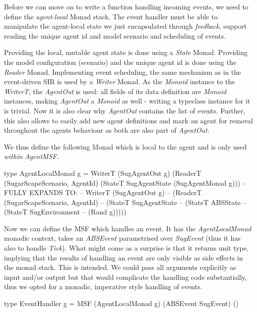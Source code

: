 Before we can move on to write a function handling incoming events, we need to define the \textit{agent-local} Monad stack. The event handler must be able to manipulate the agent-local state we just encapsulated through \textit{feedback}, support reading the unique agent id and model scenario and scheduling of events.

Providing the local, mutable agent state is done using a \textit{State} Monad. Providing the model configuration (scenario) and the unique agent id is done using the \textit{Reader} Monad. Implementing event scheduling, the same mechanism as in the event-driven SIR is used by a \textit{Writer} Monad. As the \textit{Monoid} instance to the \textit{WriterT}, the \textit{AgentOut} is used: all fields of its data definition are \textit{Monoid} instances, making \textit{AgentOut} a \textit{Monoid} as well - writing a typeclass instance for it is trivial. Now it is also clear why \textit{AgentOut} contains the list of events. Further, this also allows to easily add new agent definitions and mark an agent for removal throughout the agents behaviour as both are also part of \textit{AgentOut}.

We thus define the following Monad which is local to the agent and is only used \textit{within} \textit{AgentMSF}.

\begin{HaskellCode}
type AgentLocalMonad g = WriterT (SugAgentOut g) 
                           (ReaderT (SugarScapeScenario, AgentId) 
                             (StateT SugAgentState (SugAgentMonad g)))     
-- FULLY EXPANDS TO:
-- WriterT (SugAgentOut g) 
--  (ReaderT (SugarScapeScenario, AgentId) 
--    (StateT SugAgentState 
--      (StateT ABSState 
--        (StateT SugEnvironment 
--          (Rand g)))))
\end{HaskellCode}

Now we can define the MSF which handles an event. It has the \textit{AgentLocalMonad} monadic context, takes an \textit{ABSEvent} parametrised over \textit{SugEvent} (thus it has also to handle \textit{Tick}). What might come as a surprise is that it returns unit type, implying that the results of handling an event are only visible as side effects in the monad stack. This is intended. We could pass all arguments explicitly as input and/or output but that would complicate the handling code substantially, thus we opted for a monadic, imperative style handling of events.

\begin{HaskellCode}
type EventHandler g = MSF (AgentLocalMonad g) (ABSEvent SugEvent) ()
\end{HaskellCode}

